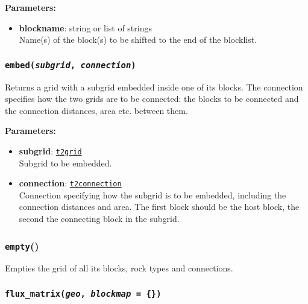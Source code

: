 \textbf{Parameters:}
\begin{itemize}
\item \textbf{blockname}: string or list of strings\\
  Name(s) of the block(s) to be shifted to the end of the blocklist.
\end{itemize}

\begin{snugshade}
\subsubsection{\texttt{embed(\emph{subgrid}, \emph{connection})}}
\end{snugshade}
\label{sec:t2grid:embed}

Returns a grid with a subgrid embedded inside one of its blocks.  The connection specifies how the two grids are to be connected: the blocks to be connected and the connection distances, area etc. between them.

\textbf{Parameters:}
\begin{itemize}
\item \textbf{subgrid}: \hyperref[t2grids]{\texttt{t2grid}}\\
  Subgrid to be embedded.
\item \textbf{connection}: \hyperref[t2connectionobjects]{\texttt{t2connection}}\\
  Connection specifying how the subgrid is to be embedded, including the connection distances and area.  The first block should be the host block, the second the connecting block in the subgrid.
\end{itemize}

\begin{snugshade}
\subsubsection{\texttt{empty}()}
\end{snugshade}
\label{sec:t2grid:empty}

Empties the grid of all its blocks, rock types and connections.

\begin{snugshade}
\subsubsection{\texttt{flux\_matrix(\emph{geo}, \emph{blockmap} = \{\})}}
\end{snugshade}
\label{sec:t2grid:flux_matrix}

